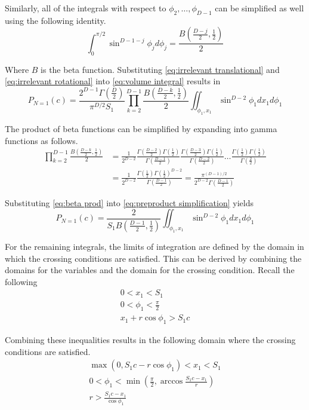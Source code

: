 \documentclass{article}
\begin{document}
Similarly, all of the integrals with respect to $\phi_2, \hdots, \phi_{D-1}$ can be simplified as well using the following identity.
\begin{equation}
	\int_0^{\pi/2}\sin^{D-1-j}\phi_jd\phi_j = \frac{B(\frac{D-j}{2}, \frac{1}{2})}{2}\label{eq:irrelevant rotational}
\end{equation}

Where $B$ is the beta function. Substituting \ref{eq:irrelevant translational} and \ref{eq:irrelevant rotational} into 
\ref{eq:volume integral} results in
\begin{equation} \label{eq:preproduct simplification}
	P_{N=1}(c) = \frac{2^{D-1}\Gamma(\frac{D}{2})}{\pi^{D/2}S_1} \prod_{k=2}^{D-1}\frac{B(\frac{D-k}{2}, \frac{1}{2})}{2} \iint_{\phi_1,x_1}\sin^{D-2}\phi_1 dx_1 d\phi_1
\end{equation}

The product of beta functions can be simplified by expanding into gamma functions as follows.
\begin{align}
	\prod_{k=2}^{D-1}\frac{B(\frac{D-k}{2}, \frac{1}{2})}{2} &= \frac{1}{2^{D-2}} \frac{\Gamma(\frac{D-2}{2})\Gamma(\frac{1}{2})}{\Gamma(\frac{D-1}{2})} \frac{\Gamma(\frac{D-3}{2})\Gamma(\frac{1}{2})}{\Gamma(\frac{D-2}{2})} \hdots \frac{\Gamma(\frac{1}{2})\Gamma(\frac{1}{2})}{\Gamma(\frac{2}{2})} \\
	&= \frac{1}{2^{D-2}} \frac{\Gamma(\frac{1}{2})\Gamma(\frac{1}{2})^{D-2}}{\Gamma(\frac{D-1}{2})} = \frac{\pi^{(D-1)/2}}{2^{D-2}\Gamma(\frac{D-1}{2})} \label{eq:beta prod}
\end{align}

Substituting \ref{eq:beta prod} into \ref{eq:preproduct simplification} yields
\begin{equation}
	P_{N=1}(c) = \frac{2}{S_1B(\frac{D-1}{2}, \frac{1}{2})} \iint_{\phi_1,x_1}\sin^{D-2}\phi_1 dx_1 d\phi_1 \label{eq:n=1 int}
\end{equation}

For the remaining integrals, the limits of integration are defined by the domain in which the crossing conditions are satisfied. This
can be derived by combining the domains for the variables and the domain for the crossing condition. Recall the following
\begin{gather*}
	0 < x_1 < S_1 \\
	0 < \phi_1 < \frac{\pi}{2} \\
	x_1 + r\cos\phi_1 > S_1c
\end{gather*}

Combining these inequalities results in the following domain where the crossing conditions are satisfied.
\begin{gather}
	\max(0, S_1c-r\cos\phi_1) < x_1 < S_1 \label{eq:x cross cond} \\
	0 < \phi_1 < \min(\frac{\pi}{2}, \arccos\frac{S_1c-x_1}{r}) \label{eq:phi cross cond} \\
	r > \frac{S_1c - x_1}{\cos{\phi_1}} \label{eq:r cross cond}
\end{gather}
\end{document}
